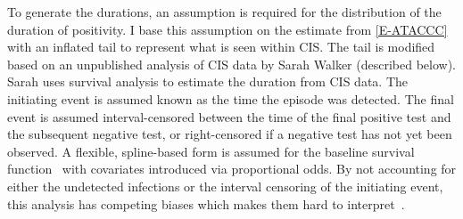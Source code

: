 \documentclass[thesis.tex]{subfiles}
\begin{document}
To generate the durations, an assumption is required for the distribution of the duration of positivity.
I base this assumption on the estimate from \cref{E-ATACCC} with an inflated tail to represent what is seen within CIS.
The tail is modified based on an unpublished analysis of CIS data by Sarah Walker (described below).
Sarah uses survival analysis to estimate the duration from CIS data.
The initiating event is assumed known as the time the episode was detected.
The final event is assumed interval-censored between the time of the final positive test and the subsequent negative test, or right-censored if a negative test has not yet been observed.
A flexible, spline-based form is assumed for the baseline survival function~\autocite{roystonSTPM,roystonFlexible} with covariates introduced via proportional odds.
By not accounting for either the undetected infections or the interval censoring of the initiating event, this analysis has competing biases which makes them hard to interpret~\autocite{cisMethodsONS}.

\end{document}
